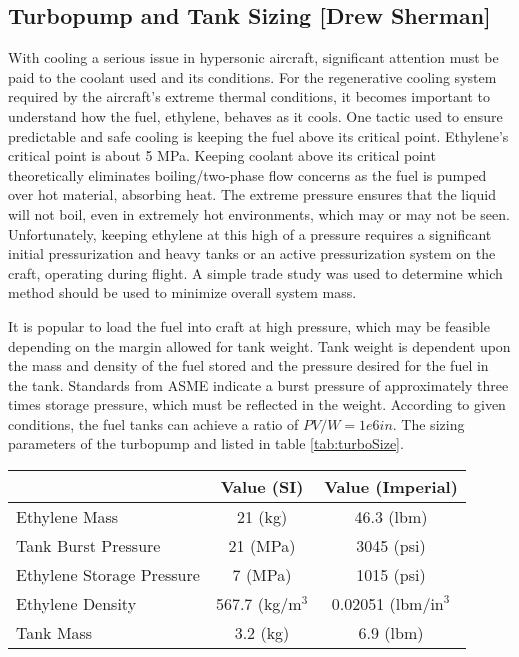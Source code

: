 \subsection{Turbopump and Tank Sizing [Drew Sherman]}
With cooling a serious issue in hypersonic aircraft, significant attention must be paid to the coolant used and its conditions. For the regenerative cooling system required by the aircraft’s extreme thermal conditions, it becomes important to understand how the fuel, ethylene, behaves as it cools. One tactic used to ensure predictable and safe cooling is keeping the fuel above its critical point. Ethylene’s critical point is about 5 MPa. Keeping coolant above its critical point theoretically eliminates boiling/two-phase flow concerns as the fuel is pumped over hot material, absorbing heat. The extreme pressure ensures that the liquid will not boil, even in extremely hot environments, which may or may not be seen. Unfortunately, keeping ethylene at this high of a pressure requires a significant initial pressurization and heavy tanks or an active pressurization system on the craft, operating during flight. A simple trade study was used to determine which method should be used to minimize overall system mass. 

It is popular to load the fuel into craft at high pressure, which may be feasible depending on the margin allowed for tank weight. Tank weight is dependent upon the mass and density of the fuel stored and the pressure desired for the fuel in the tank. Standards from ASME \cite{asme} indicate a burst pressure of approximately three times storage pressure, which must be reflected in the weight. According to given conditions, the fuel tanks can achieve a ratio of $PV/W = 1e6 in$. The sizing parameters of the turbopump and listed in table \ref{tab:turboSize}.

\begin{center}
\begin{tabular}{l | c | c}
& Value (SI) & Value (Imperial) \\
\hline
Ethylene Mass & 21 (kg) & 46.3 (lbm) \\
Tank Burst Pressure & 21 (MPa) & 3045 (psi) \\
Ethylene Storage Pressure & 7 (MPa) & 1015 (psi) \\
Ethylene Density & 567.7 (kg/$\text{m}^3$ & 0.02051 (lbm/$\text{in}^3$ \\
Tank Mass & 3.2 (kg) & 6.9 (lbm)
\end{tabular}
\label{tab:turboSize}
\end{center}

